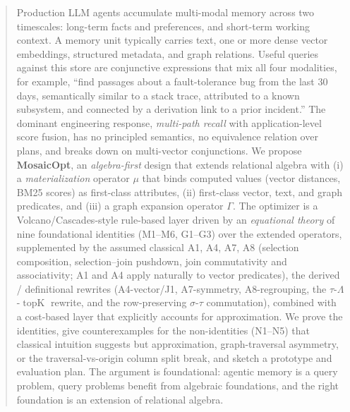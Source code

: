 \documentclass[sigconf]{acmart}
\theoremstyle{plain}
\theoremstyle{definition}
\newcommand{\topK}{\operatorname{topK}}
\theoremstyle{remark}
\begin{document}
\begin{abstract}
\noindent
Production LLM agents accumulate multi-modal memory across two timescales:
long-term facts and preferences, and short-term working context. A memory
unit typically carries text, one or more dense vector embeddings,
structured metadata, and graph relations. Useful queries against this
store are conjunctive expressions that mix all four modalities, for
example, ``find passages about a fault-tolerance bug from the last 30
days, semantically similar to a stack trace, attributed to a known
subsystem, and connected by a derivation link to a prior incident.'' The
dominant engineering response, \emph{multi-path recall} with
application-level score fusion, has no principled semantics, no
equivalence relation over plans, and breaks down on multi-vector
conjunctions. We propose \textbf{MosaicOpt}, an \emph{algebra-first}
design that extends relational algebra with (i) a \emph{materialization}
operator $\mu$ that binds computed values (vector distances, BM25
scores) as first-class attributes, (ii) first-class vector, text, and
graph predicates, and (iii) a graph expansion operator $\Gamma$. The
optimizer is a Volcano/Cascades-style rule-based layer driven by an
\emph{equational theory} of nine foundational identities (M1--M6,
G1--G3) over the extended operators, supplemented by the assumed
classical A1, A4, A7, A8 (selection composition, selection--join
pushdown, join commutativity and associativity; A1 and A4 apply
naturally to vector predicates), the derived / definitional
rewrites (A4-vector/J1, A7-symmetry, A8-regrouping, the
$\tau$-$\Lambda$-$\topK$ rewrite, and the row-preserving
$\sigma$-$\tau$ commutation), combined with a cost-based layer that
explicitly accounts for approximation. We prove the identities, give counterexamples for the
non-identities (N1--N5) that classical intuition suggests but
approximation, graph-traversal asymmetry, or the
traversal-vs-origin column split break, and sketch a prototype and
evaluation plan. The argument is foundational: agentic memory is a
query problem, query
problems benefit from algebraic foundations, and the right foundation
is an extension of relational algebra.
\end{abstract}

\maketitle

\end{document}

